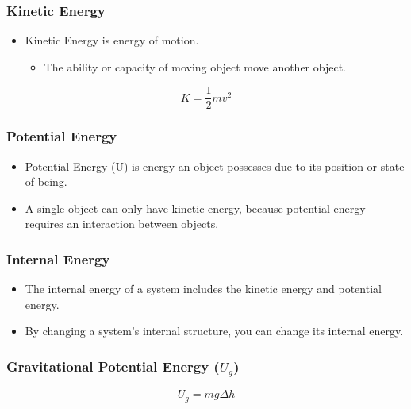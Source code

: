 \documentclass[../Notes.tex]{subfiles}
\begin{document}
\subsubsection{Kinetic Energy}
\begin{itemize}
	\item Kinetic Energy is energy of motion.
	\begin{itemize}
		\item The ability or capacity of moving object move another object.
	\end{itemize}
\end{itemize}
\begin{equation*}
	K = \frac12 mv^2
\end{equation*}

\subsubsection{Potential Energy}
\begin{itemize}
	\item Potential Energy (U) is energy an object possesses due to its position or state of being.
	\item A single object can only have kinetic energy, because potential energy requires an 
		interaction between objects.
\end{itemize}

\subsubsection{Internal Energy}
\begin{itemize}
	\item The internal energy of a system includes the kinetic energy and potential energy.
	\item By changing a system's internal structure, you can change its internal energy.
\end{itemize}

\subsubsection{Gravitational Potential Energy ($U_g$)}
\begin{equation*}
	U_g = mg \Delta h
\end{equation*}
\end{document}
